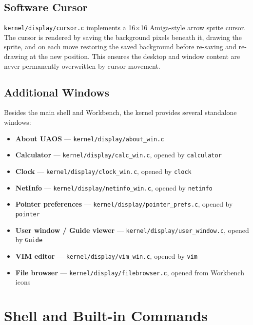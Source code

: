 \documentclass[11pt,a4paper]{report}
\begin{document}
\section{Software Cursor}

\texttt{kernel/display/cursor.c} implements a 16$\times$16 Amiga-style arrow
sprite cursor.  The cursor is rendered by saving the background pixels beneath
it, drawing the sprite, and on each move restoring the saved background before
re-saving and re-drawing at the new position.  This ensures the desktop and
window content are never permanently overwritten by cursor movement.

\section{Additional Windows}

Besides the main shell and Workbench, the kernel provides several standalone
windows:

\begin{itemize}
    \item \textbf{About UAOS} --- \texttt{kernel/display/about\_win.c}
    \item \textbf{Calculator} --- \texttt{kernel/display/calc\_win.c}, opened by \texttt{calculator}
    \item \textbf{Clock} --- \texttt{kernel/display/clock\_win.c}, opened by \texttt{clock}
    \item \textbf{NetInfo} --- \texttt{kernel/display/netinfo\_win.c}, opened by \texttt{netinfo}
    \item \textbf{Pointer preferences} --- \texttt{kernel/display/pointer\_prefs.c}, opened by \texttt{pointer}
    \item \textbf{User window / Guide viewer} --- \texttt{kernel/display/user\_window.c}, opened by \texttt{Guide}
    \item \textbf{VIM editor} --- \texttt{kernel/display/vim\_win.c}, opened by \texttt{vim}
    \item \textbf{File browser} --- \texttt{kernel/display/filebrowser.c}, opened from Workbench icons
\end{itemize}

\chapter{Shell and Built-in Commands}
\end{document}
